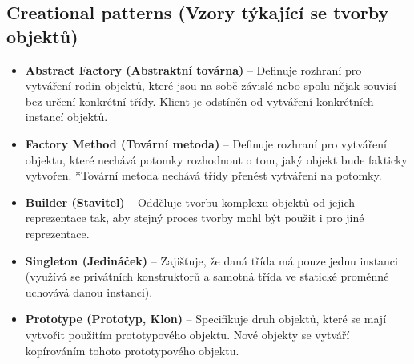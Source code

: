 \subsection{Creational patterns (Vzory týkající se tvorby objektů)}
\begin{itemize}
    \item \textbf{Abstract Factory (Abstraktní továrna)} -- Definuje rozhraní pro vytváření rodin objektů, které jsou na sobě závislé nebo spolu nějak souvisí bez určení konkrétní třídy. Klient je odstíněn od vytváření konkrétních instancí objektů.
    \item \textbf{Factory Method (Tovární metoda)} -- Definuje rozhraní pro vytváření objektu, které nechává potomky rozhodnout o tom, jaký objekt bude fakticky vytvořen. *Tovární metoda nechává třídy přenést vytváření na potomky.
    \item \textbf{Builder (Stavitel)} -- Odděluje tvorbu komplexu objektů od jejich reprezentace tak, aby stejný proces tvorby mohl být použit i pro jiné reprezentace.
    \item \textbf{Singleton (Jedináček)} -- Zajišťuje, že daná třída má pouze jednu instanci (využívá se privátních konstruktorů a samotná třída ve statické proměnné uchovává danou instanci).
    \item \textbf{Prototype (Prototyp, Klon)} -- Specifikuje druh objektů, které se mají vytvořit použitím prototypového objektu. Nové objekty se vytváří kopírováním tohoto prototypového objektu.
\end{itemize}

